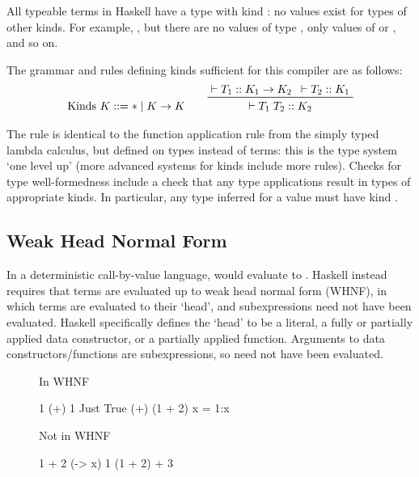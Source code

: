 \documentclass[dissertation.tex]{subfiles}
\begin{document}
{{        All typeable terms in Haskell have a type with kind \haskell{*}: no values exist for types of other kinds. For example, , but there are no values of type , only values of  or , and so on.

        The grammar and rules defining kinds sufficient for this compiler are as follows:
        \begin{gather*}
        \text{Kinds } K ::= * \mid K \rightarrow K
        \qquad
        \prftree[r]{}
        {\vdash T_1 :: K_1 \rightarrow K_2}
        {\vdash T_2 :: K_1}
        {\vdash T_1\;T_2 :: K_2}
        \end{gather*}
        
        The rule is identical to the function application rule from the simply typed lambda calculus, but defined on types instead of terms: this is the type system `one level up' (more advanced systems for kinds include more rules). Checks for type well-formedness include a check that any type applications result in types of appropriate kinds. In particular, any type inferred for a value must have kind \haskell{*}.
    }
    \subsection{Weak Head Normal Form}\label{sec:whnf}
    {
        In a deterministic call-by-value language,  would evaluate to . Haskell instead requires that terms are evaluated up to weak head normal form (WHNF), in which terms are evaluated to their `head', and subexpressions need not have been evaluated. Haskell specifically defines the `head' to be a literal, a fully or partially applied data constructor, or a partially applied function. Arguments to data constructors/functions are subexpressions, so need not have been evaluated.

        \begin{figure}[h]
        \centering
        \begin{minipage}[t]{0.2\textwidth}
        \centering
        In WHNF
        \vspace{-5mm}
        \begin{haskellfigure}
        1
        (+) 1
        Just True
        (+) (1 + 2)
        x = 1:x
        \end{haskellfigure}
        \end{minipage}
        \hspace{3cm}
        \begin{minipage}[t]{0.2\textwidth}
        \centering
        Not in WHNF
        \vspace{-5mm}
        \begin{haskellfigure}
        1 + 2
        (\x -> x) 1
        (1 + 2) + 3
        \end{haskellfigure}
        \end{minipage}
        \end{figure}

}}
\end{document}
